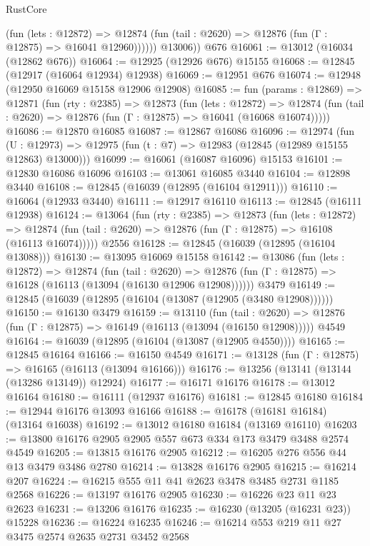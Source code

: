 \begin{lexlean}{RustCore}
\begin{coremodule}
              (fun (lets : @12872) =>
              @12874 (fun (tail : @2620) => @12876 (fun (Γ : @12875) => @16041 @12960))))))
        @13006))
    @676
@16061 := @13012 (@16034 (@12862 @676))
@16064 := @12925 (@12926 @676) @15155
@16068 := @12845 (@12917 (@16064 @12934) @12938)
@16069 := @12951 @676
@16074 := @12948 (@12950 @16069 @15158 @12906 @12908)
@16085 := fun (params : @12869) =>
  @12871
    (fun (rty : @2385) =>
    @12873
      (fun (lets : @12872) =>
      @12874 (fun (tail : @2620) => @12876 (fun (Γ : @12875) => @16041 (@16068 @16074)))))
@16086 := @12870 @16085
@16087 := @12867 @16086
@16096 := @12974
    (fun (U : @12973) => @12975 (fun (t : @7) => @12983 (@12845 (@12989 @15155 @12863) @13000)))
@16099 := @16061 (@16087 @16096) @15153
@16101 := @12830 @16086 @16096
@16103 := @13061 @16085 @3440
@16104 := @12898 @3440
@16108 := @12845 (@16039 (@12895 (@16104 @12911)))
@16110 := @16064 (@12933 @3440)
@16111 := @12917 @16110
@16113 := @12845 (@16111 @12938)
@16124 := @13064
    (fun (rty : @2385) =>
    @12873
      (fun (lets : @12872) =>
      @12874 (fun (tail : @2620) => @12876 (fun (Γ : @12875) => @16108 (@16113 @16074)))))
    @2556
@16128 := @12845 (@16039 (@12895 (@16104 @13088)))
@16130 := @13095 @16069 @15158
@16142 := @13086
    (fun (lets : @12872) =>
    @12874
      (fun (tail : @2620) =>
      @12876 (fun (Γ : @12875) => @16128 (@16113 (@13094 (@16130 @12906 @12908))))))
    @3479
@16149 := @12845 (@16039 (@12895 (@16104 (@13087 (@12905 (@3480 @12908))))))
@16150 := @16130 @3479
@16159 := @13110
    (fun (tail : @2620) => @12876 (fun (Γ : @12875) => @16149 (@16113 (@13094 (@16150 @12908)))))
    @4549
@16164 := @16039 (@12895 (@16104 (@13087 (@12905 @4550))))
@16165 := @12845 @16164
@16166 := @16150 @4549
@16171 := @13128 (fun (Γ : @12875) => @16165 (@16113 (@13094 @16166)))
@16176 := @13256 (@13141 (@13144 (@13286 @13149)) @12924)
@16177 := @16171 @16176
@16178 := @13012 @16164
@16180 := @16111 (@12937 @16176)
@16181 := @12845 @16180
@16184 := @12944 @16176 @13093 @16166
@16188 := @16178 (@16181 @16184) (@13164 @16038)
@16192 := @13012 @16180 @16184 (@13169 @16110)
@16203 := @13800 @16176 @2905 @2905 @557 @673 @334 @173 @3479 @3488 @2574 @4549
@16205 := @13815 @16176 @2905
@16212 := @16205 @276 @556 @44 @13 @3479 @3486 @2780
@16214 := @13828 @16176 @2905
@16215 := @16214 @207
@16224 := @16215 @555 @11 @41 @2623 @3478 @3485 @2731 @1185 @2568
@16226 := @13197 @16176 @2905
@16230 := @16226 @23 @11 @23 @2623
@16231 := @13206 @16176
@16235 := @16230 (@13205 (@16231 @23)) @15228
@16236 := @16224 @16235
@16246 := @16214 @553 @219 @11 @27 @3475 @2574 @2635 @2731 @3452 @2568

\end{coremodule}
\end{lexlean}
